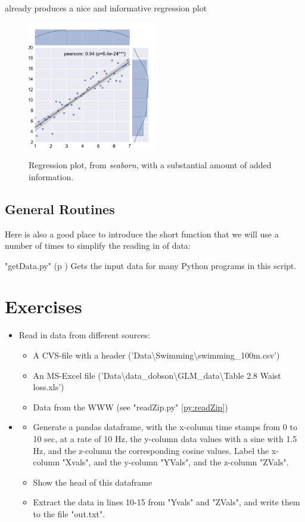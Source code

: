 already produces a nice and informative regression plot

\begin{figure}[ht]
  \centering
  \includegraphics[width=0.5\textwidth]{../Images/regplot.png}\\
  \caption{Regression plot, from \emph{seaborn}, with a substantial amount of added information.}
\end{figure}

\subsection{General Routines}
Here is also a good place to introduce the short function that we will use a number of times to simplify the reading in of data:

\PyImg "getData.py" (p \pageref{py:getData}) Gets the input data for many Python programs in this script.

\section{Exercises}

\begin{itemize}
  \item Read in data from different sources:
  \begin{itemize}
    \item A CVS-file with a header ('Data\textbackslash Swimming\textbackslash swimming\_100m.csv')
    \item An MS-Excel file ('Data\textbackslash data\_dobson\textbackslash GLM\_data\textbackslash Table 2.8 Waist loss.xls')
    \item Data from the WWW (see "readZip.py" \ref{py:readZip})
  \end{itemize}
  \item
  \begin{itemize}
      \item Generate a pandas dataframe, with the x-column time stamps from 0 to 10 sec, at a rate of 10 Hz, the y-column data values with a sine with 1.5 Hz, and the z-column the corresponding cosine values. Label the x-column "Xvals", and the y-column "YVals", and the z-column "ZVals".
      \item Show the head of this dataframe
      \item Extract the data in lines 10-15 from "Yvals" and "ZVals", and write them to the file "out.txt".
  \end{itemize}
\end{itemize}
